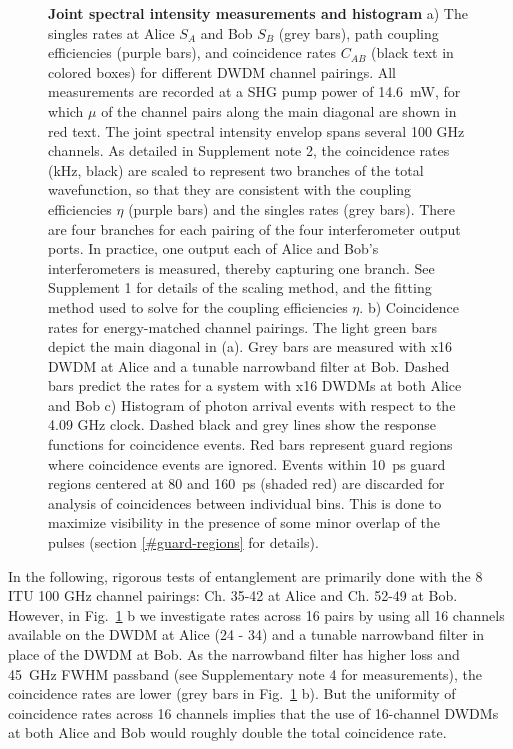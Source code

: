 \documentclass[11pt]{caltech_thesis} %
\begin{document}
{\begin{figure}
\caption[{Joint spectral intensity measurements and histogram}]{\textbf{Joint spectral intensity measurements and histogram} a) The singles rates at Alice $S_A$ and Bob $S_B$ (grey bars), path coupling efficiencies (purple bars), and coincidence rates $C_{AB}$ (black text in colored boxes) for different DWDM channel pairings. All measurements are recorded at a SHG pump power of 14.6~mW, for which $\mu$ of the channel pairs along the main diagonal are shown in red text. The joint spectral intensity envelop spans several 100 GHz channels. As detailed in Supplement note 2, the coincidence rates (kHz, black) are scaled to represent two branches of the total wavefunction, so that they are consistent with the coupling efficiencies $\eta$ (purple bars) and the singles rates (grey bars). There are four branches for each pairing of the four interferometer output ports. In practice, one output each of Alice and Bob's interferometers is measured, thereby capturing one branch. See Supplement 1 for details of the scaling method, and the fitting method used to solve for the coupling efficiencies $\eta$. b) Coincidence rates for energy-matched channel pairings. The light green bars depict the main diagonal in (a). Grey bars are measured with x16 DWDM at Alice and a tunable narrowband filter at Bob. Dashed bars predict the rates for a system with x16 DWDMs at both Alice and Bob c) Histogram of photon arrival events with respect to the 4.09 GHz clock. Dashed black and grey lines show the response functions for coincidence events. Red bars represent guard regions where coincidence events are ignored. Events within 10~ps guard regions centered at 80 and 160~ps (shaded red) are discarded for analysis of coincidences between individual bins. This is done to maximize visibility in the presence of some minor overlap of the pulses (section \ref{#guard-regions} for details).}
\label{fig:figure_2nd_1}
\end{figure}
}

In the following, rigorous tests of entanglement are primarily done with the 8 ITU 100 GHz channel pairings: Ch. 35-42 at Alice and Ch. 52-49 at Bob. However, in Fig.~\ref{fig:figure_2nd_1} b we investigate rates across 16 pairs by using all 16 channels available on the DWDM at Alice (24 - 34) and a tunable narrowband filter in place of the DWDM at Bob. As the narrowband filter has higher loss and 45~GHz FWHM passband (see Supplementary note 4 for measurements), the coincidence rates are lower (grey bars in Fig.~\ref{fig:figure_2nd_1} b). But the uniformity of coincidence rates across 16 channels implies that the use of 16-channel DWDMs at both Alice and Bob would roughly double the total coincidence rate.
\end{document}
